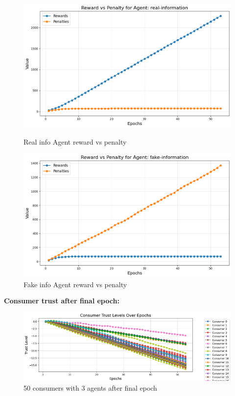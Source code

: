 \documentclass[twoside]{article}
\begin{document}
 \begin{figure}[htbp]
     \centering
     \begin{minipage}[b]{0.45\textwidth}
         \centering
         \includegraphics[width=\textwidth]{../results/50consumer/real_rp.png}
         \caption{Real info Agent reward vs penalty}
         \label{fig:image3}
     \end{minipage}
     \hfill
     \begin{minipage}[b]{0.45\textwidth}
         \centering
         \includegraphics[width=\textwidth]{../results/50consumer/fake_rp.png}
         \caption{Fake info Agent reward vs penalty}
         \label{fig:image4}
     \end{minipage}
 \end{figure}


\pagebreak
\textbf{Consumer trust after final epoch: }

\begin{figure}[htbp]
     \centering
     \includegraphics[width=1.0\textwidth]{../results/50consumer/finaltrust.png}
     \caption{50 consumers with 3 agents after final epoch}
     \label{fig: 50 consumer, 3 agentss}
 \end{figure}
\end{document}
